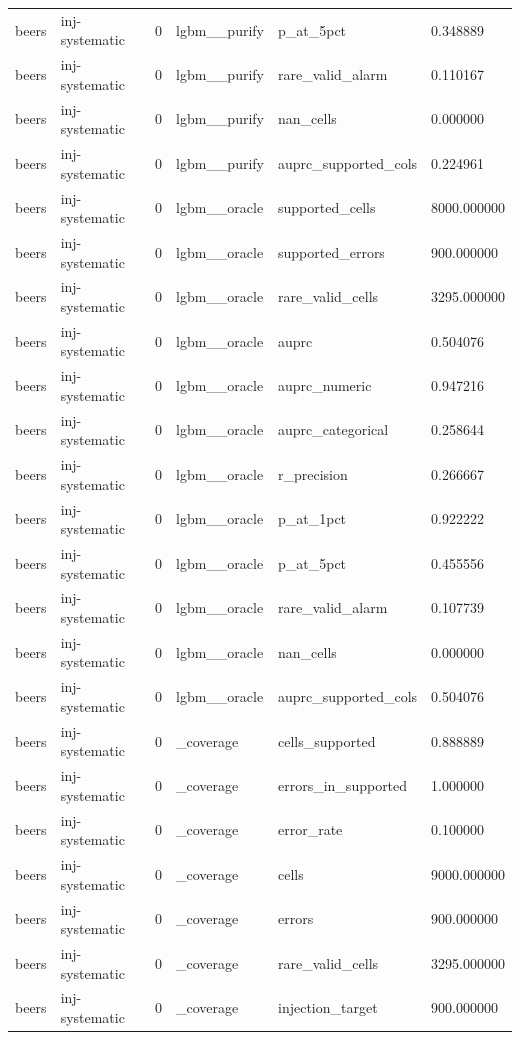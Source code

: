 \begin{tabular}{llllll}
beers & inj-systematic & 0 & lgbm\_\_purify & p\_at\_5pct & 0.348889 \\
beers & inj-systematic & 0 & lgbm\_\_purify & rare\_valid\_alarm & 0.110167 \\
beers & inj-systematic & 0 & lgbm\_\_purify & nan\_cells & 0.000000 \\
beers & inj-systematic & 0 & lgbm\_\_purify & auprc\_supported\_cols & 0.224961 \\
beers & inj-systematic & 0 & lgbm\_\_oracle & supported\_cells & 8000.000000 \\
beers & inj-systematic & 0 & lgbm\_\_oracle & supported\_errors & 900.000000 \\
beers & inj-systematic & 0 & lgbm\_\_oracle & rare\_valid\_cells & 3295.000000 \\
beers & inj-systematic & 0 & lgbm\_\_oracle & auprc & 0.504076 \\
beers & inj-systematic & 0 & lgbm\_\_oracle & auprc\_numeric & 0.947216 \\
beers & inj-systematic & 0 & lgbm\_\_oracle & auprc\_categorical & 0.258644 \\
beers & inj-systematic & 0 & lgbm\_\_oracle & r\_precision & 0.266667 \\
beers & inj-systematic & 0 & lgbm\_\_oracle & p\_at\_1pct & 0.922222 \\
beers & inj-systematic & 0 & lgbm\_\_oracle & p\_at\_5pct & 0.455556 \\
beers & inj-systematic & 0 & lgbm\_\_oracle & rare\_valid\_alarm & 0.107739 \\
beers & inj-systematic & 0 & lgbm\_\_oracle & nan\_cells & 0.000000 \\
beers & inj-systematic & 0 & lgbm\_\_oracle & auprc\_supported\_cols & 0.504076 \\
beers & inj-systematic & 0 & \_coverage & cells\_supported & 0.888889 \\
beers & inj-systematic & 0 & \_coverage & errors\_in\_supported & 1.000000 \\
beers & inj-systematic & 0 & \_coverage & error\_rate & 0.100000 \\
beers & inj-systematic & 0 & \_coverage & cells & 9000.000000 \\
beers & inj-systematic & 0 & \_coverage & errors & 900.000000 \\
beers & inj-systematic & 0 & \_coverage & rare\_valid\_cells & 3295.000000 \\
beers & inj-systematic & 0 & \_coverage & injection\_target & 900.000000 \\

\end{tabular}
